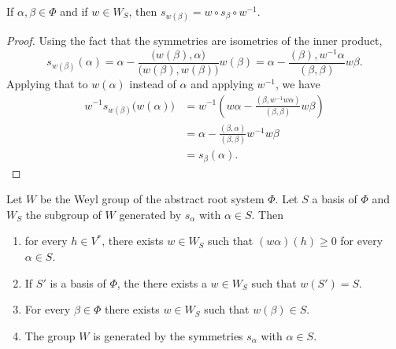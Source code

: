 \begin{lemma}\label{Lemswwsbwemucirc}
	If \( \alpha,\beta\in\Phi\) and if \( w\in W_S\), then \( s_{w(\beta)}=w\circ s_{\beta}\circ w^{-1}\).
\end{lemma}

\begin{proof}
	Using the fact that the symmetries are isometries of the inner product,
	\begin{equation}
		s_{w(\beta)}(\alpha)=\alpha-\frac{ \big( w(\beta),\alpha \big) }{ \big( w(\beta),w(\beta) \big) }w(\beta)=\alpha-\frac{ (\beta),w^{-1}\alpha }{ (\beta,\beta) }w\beta.
	\end{equation}
	Applying that to \( w(\alpha)\) instead of \( \alpha\) and applying \( w^{-1}\), we have
	\begin{subequations}
		\begin{align}
			w^{-1}s_{w(\beta)}\big(w(\alpha)\big) & =w^{-1}\left( w\alpha-\frac{ (\beta,w^{-1}w\alpha) }{ (\beta,\beta) }w\beta \right) \\
			                                      & =\alpha-\frac{ (\beta,\alpha) }{ (\beta,\beta) }w^{-1}w\beta                        \\
			                                      & =s_{\beta}(\alpha).
		\end{align}
	\end{subequations}
\end{proof}

\begin{theorem}     \label{ThoWeylGenere}
	Let \( W\) be the Weyl group of the abstract root system \( \Phi\). Let \( S\) a basis of \( \Phi\) and \( W_S\) the subgroup of \( W\) generated by \( s_{\alpha}\) with \(\alpha\in S\). Then
	\begin{enumerate}
		\item   \label{ItemThoWeylGenerei}
		      for every \( h\in V^*\), there exists \( w\in W_S\) such that \( (w\alpha)(h)\geq 0\) for every \( \alpha\in S\).
		\item   \label{ItemThoWeylGenereii}
		      If \( S'\) is a basis of \( \Phi\), the there exists a \( w\in W_S\) such that \( w(S')=S\).
		      \item\label{ItemThoWeylGenereiii}
		      For every \( \beta\in\Phi\) there exists \( w\in W_S\) such that \( w(\beta)\in S\).
		      \item\label{ItemThoWeylGenereiv}
		      The group \( W\) is generated by the symmetries \( s_{\alpha}\) with \( \alpha\in S\).
	\end{enumerate}
\end{theorem}

